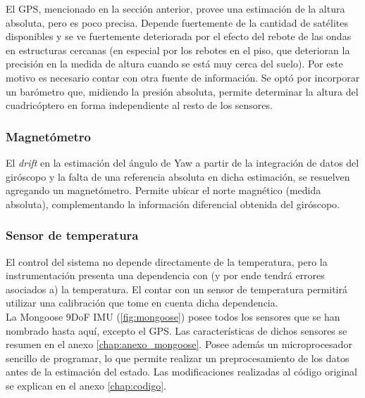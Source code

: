 \documentclass[main]{subfiles}
\begin{document}
El GPS, mencionado en la secci\'on anterior, provee una estimaci\'on de la altura absoluta, pero es poco precisa. Depende fuertemente de la cantidad de sat\'elites disponibles y se ve fuertemente deteriorada por el efecto del rebote de las ondas en estructuras cercanas (en especial por los rebotes en el piso, que deterioran la precisi\'on en la medida de altura cuando se est\'a muy cerca del suelo). Por este motivo es necesario contar con otra fuente de informaci\'on. Se opt\'o por incorporar un bar\'ometro que, midiendo la presi\'on absoluta, permite determinar la altura del cuadric\'optero en forma independiente al resto de los sensores.

\subsubsection{Magnet\'ometro}

El \textit{drift} en la estimaci\'on del \'angulo de Yaw a partir de la integraci\'on de datos del gir\'oscopo y la falta de una referencia absoluta en dicha estimaci\'on, se resuelven agregando un magnet\'ometro. Permite ubicar el norte magn\'etico (medida absoluta), complementando la informaci\'on diferencial obtenida del gir\'oscopo.

\subsubsection{Sensor de temperatura}

El control del sistema no depende directamente de la temperatura, pero la instrumentaci\'on presenta una dependencia con (y por ende tendr\'a errores asociados a) la temperatura. El contar con un sensor de temperatura permitir\'a utilizar una calibraci\'on que tome en cuenta dicha dependencia.\\

La Mongoose 9DoF IMU (\ref{fig:mongoose}) posee todos los sensores que se han nombrado hasta aqu\'i, excepto el GPS. Las caracter\'isticas de dichos sensores se resumen en el anexo \ref{chap:anexo_mongoose}. Posee adem\'as un microprocesador sencillo de programar, lo que permite realizar un preprocesamiento de los datos antes de la estimaci\'on del estado. Las modificaciones realizadas al c\'odigo original se explican en el anexo \ref{chap:codigo}.
\end{document}
